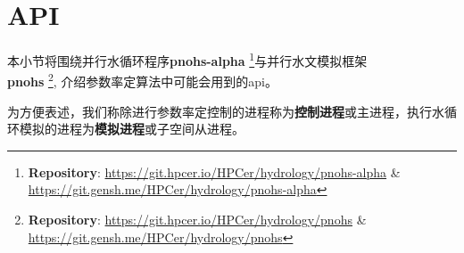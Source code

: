 \section{API}
本小节将围绕并行水循环程序\textbf{pnohs-alpha}
\footnote{
    \textbf{Repository}: \url{https://git.hpcer.io/HPCer/hydrology/pnohs-alpha} \& \url{https://git.gensh.me/HPCer/hydrology/pnohs-alpha}
}与并行水文模拟框架\\\textbf{pnohs}
\footnote{
   \textbf{Repository}: \url{https://git.hpcer.io/HPCer/hydrology/pnohs} \& \url{https://git.gensh.me/HPCer/hydrology/pnohs}
}, 介绍参数率定算法中可能会用到的api。

为方便表述，我们称除进行参数率定控制的进程称为\textbf{控制进程}或主进程，执行水循环模拟的进程为\textbf{模拟进程}或子空间从进程。






